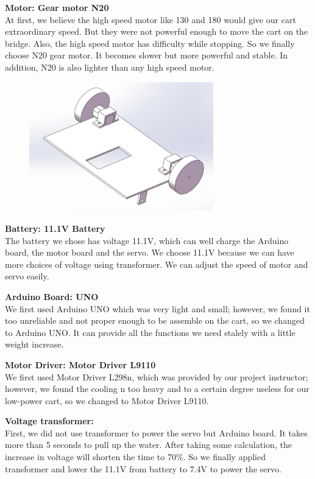 \bigskip
\noindent
\textbf{Motor: Gear motor N20 } \\
\indent
At first, we believe the high speed motor like 130 and 180 would give our cart
extraordinary speed.
But they were not powerful enough to move the cart on the bridge.
Also, the high speed motor has difficulty while stopping.
So we finally choose N20 gear motor.
It becomes slower but more powerful and stable.
In addition, N20 is also lighter than any high speed motor.  \\
\begin{figure}[H]
\begin{center}
\includegraphics[width=8cm]{figure/designOverview/p1}
\end{center}
\end{figure}

\bigskip
\noindent
\textbf{Battery: 11.1V Battery } \\
\indent
The battery we chose has voltage 11.1V, which can well charge the Arduino board,
the motor board and the servo.
We choose 11.1V because we can have more choices of voltage using transformer.
We can adjust the speed of motor and servo easily.  

\bigskip
\noindent
\textbf{Arduino Board: UNO } \\
\indent
We first used Arduino UNO which was very light and small; however, we found it
too unreliable and not proper enough to be assemble on the cart, so we changed
to Arduino UNO.
It can provide all the functions we need stalely with a little weight increase.

\bigskip
\noindent
\textbf{Motor Driver: Motor Driver L9110 } \\
\indent
We first used Motor Driver L298n, which was provided by our project instructor;
however, we found the cooling n too heavy and to a certain degree useless for
our low-power cart, so we changed to Motor Driver L9110.

\bigskip
\noindent
\textbf{Voltage transformer:} \\
\indent
First, we did not use transformer to power the servo but Arduino board.
It takes more than 5 seconds to pull up the water.
After taking some calculation, the increase in voltage will shorten the time to
70\%.
So we finally applied transformer and lower the 11.1V from battery to 7.4V to
power the servo.

